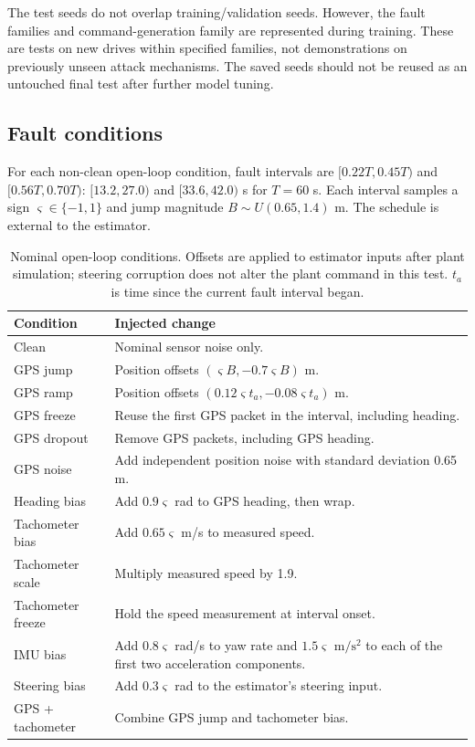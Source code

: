 ﻿\documentclass[10pt,a4paper]{article}
\begin{document}
The test seeds do not overlap training/validation seeds. However, the fault families and
command-generation family are represented during training.
These are tests on new drives within specified families, not demonstrations on
previously unseen attack mechanisms.
The saved seeds should not be reused as an untouched final test after further model tuning.

\subsection{Fault conditions}
For each non-clean open-loop condition, fault intervals are
$[0.22T,0.45T)$ and $[0.56T,0.70T)$: $[13.2,27.0)$ and $[33.6,42.0)$ s for $T=60$ s.
Each interval samples a sign $\varsigma\in\{-1,1\}$ and jump magnitude
$B\sim U(0.65,1.4)$ m. The schedule is external to the estimator.

\begin{table}[htbp]
\centering\small
\caption{Nominal open-loop conditions. Offsets are applied to estimator inputs after
plant simulation; steering corruption does not alter the plant command in this test.
$t_a$ is time since the current fault interval began.}
\label{tab:faults}
\begin{tabularx}{\linewidth}{@{}l X@{}}
\toprule
Condition & Injected change\\
\midrule
Clean & Nominal sensor noise only.\\
GPS jump & Position offsets $(\varsigma B,-0.7\varsigma B)$ m.\\
GPS ramp & Position offsets $(0.12\varsigma t_a,-0.08\varsigma t_a)$ m.\\
GPS freeze & Reuse the first GPS packet in the interval, including heading.\\
GPS dropout & Remove GPS packets, including GPS heading.\\
GPS noise & Add independent position noise with standard deviation 0.65 m.\\
Heading bias & Add $0.9\varsigma$ rad to GPS heading, then wrap.\\
Tachometer bias & Add $0.65\varsigma$ m/s to measured speed.\\
Tachometer scale & Multiply measured speed by 1.9.\\
Tachometer freeze & Hold the speed measurement at interval onset.\\
IMU bias & Add $0.8\varsigma$ rad/s to yaw rate and $1.5\varsigma$
$\mathrm{m/s^2}$ to each of the first two acceleration components.\\
Steering bias & Add $0.3\varsigma$ rad to the estimator's steering input.\\
GPS + tachometer & Combine GPS jump and tachometer bias.\\
\bottomrule
\end{tabularx}
\end{table}
\end{document}
